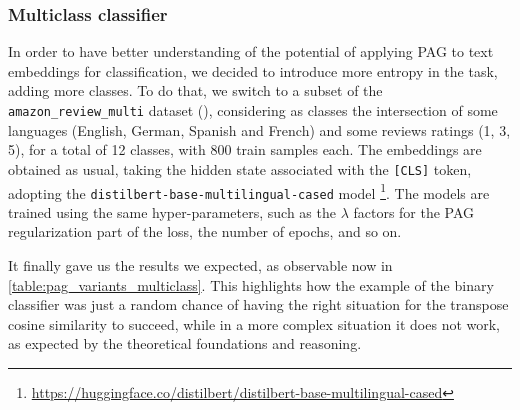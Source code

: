 \documentclass[../thesis.tex]{subfiles}
\begin{document}
\subsubsection{Multiclass classifier}
In order to have better understanding of the potential of applying PAG to text embeddings for classification,
we decided to introduce more entropy in the task, adding more classes.
To do that, we switch to a subset of the \texttt{amazon\_review\_multi} dataset (\citep{amazon-reviews-dataset}),
considering as classes the intersection of some languages (English, German, Spanish and French) and some reviews ratings (1, 3, 5), for a total of 12 classes, with 800 train samples each.
The embeddings are obtained as usual, taking the hidden state associated with the \texttt{[CLS]} token,
adopting the \texttt{distilbert-base-multilingual-cased} model
\footnote{\url{https://huggingface.co/distilbert/distilbert-base-multilingual-cased}}.
The models are trained using the same hyper-parameters, such as the $\lambda$ factors for the PAG regularization part of the loss, the number of epochs, and so on.

It finally gave us the results we expected, as observable now in \cref{table:pag_variants_multiclass}.
This highlights how the example of the binary classifier was just a random chance of having the right situation for the transpose cosine similarity to succeed, while in a more complex situation it does not work, as expected by the theoretical foundations and reasoning.
\end{document}
